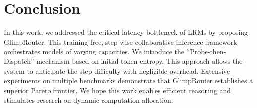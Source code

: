 \documentclass[11pt]{article}
\newcommand{\approach}{{GlimpRouter}\xspace}
\begin{document}


\section{Conclusion}
\label{sec:conclusion}

In this work, we addressed the critical latency bottleneck of LRMs by proposing \approach. This training-free, step-wise collaborative inference framework orchestrates models of varying capacities.
We introduce the ``Probe-then-Dispatch'' mechanism based on initial token entropy. This approach allows the system to anticipate the step difficulty with negligible overhead.
Extensive experiments on multiple benchmarks demonstrate that \approach establishes a superior Pareto frontier. %
We hope this work enables efficient reasoning and stimulates research on dynamic computation allocation.
\end{document}
